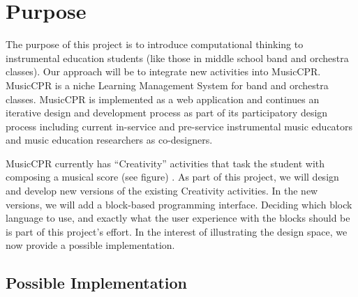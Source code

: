 \documentclass[manuscript,screen,review]{acmart}
\begin{document}


\section{Purpose}

The purpose of this project is to introduce computational thinking to instrumental education students (like those in middle school band and orchestra classes). Our approach will be to integrate new activities into MusicCPR. MusicCPR is a niche Learning Management System for band and orchestra classes. MusicCPR is implemented as a web application and continues an iterative design and development process as part of its participatory design process including current in-service and pre-service instrumental music educators and music education researchers as co-designers.

MusicCPR currently has ``Creativity'' activities that task the student with composing a musical score (see figure) . As part of this project, we will design and develop new versions of the existing Creativity activities. In the new versions, we will add a block-based programming interface. Deciding which block language to use, and exactly what the user experience with the blocks should be is part of this project's effort. In the interest of illustrating the design space, we now provide a possible implementation.

\subsection{Possible Implementation}
% 
\end{document}
